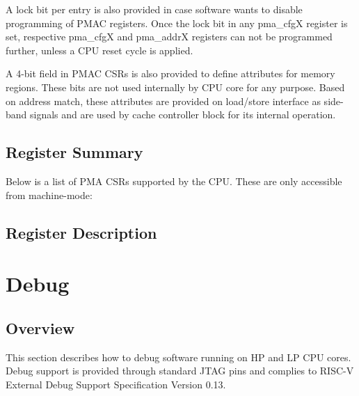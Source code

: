\documentclass[main\_\_EN.tex]{subfiles}
\begin{document}
A lock bit per entry is also provided in case software wants to disable programming of PMAC registers. Once the lock bit in any pma\_cfgX register is set, respective pma\_cfgX and pma\_addrX registers can not be programmed further, unless a CPU reset cycle is applied.

A 4-bit field in PMAC CSRs is also provided to define attributes for memory regions. These bits are not used internally by CPU core for any purpose. Based on address match, these attributes are provided on load/store interface as side-band signals and are used by cache controller block for its internal operation.


\clearpage
\hypertarget{riscvcpu-pma-reg-summ}{}
\subsection{Register Summary}
\label{sec:riscvcpu-pma-reg-summ}


Below is a list of PMA CSRs supported by the CPU. These are only accessible from machine-mode:




\subsection{Register Description}
\label{sec:riscvcpu-pma-reg-desc}




\clearpage
\section{Debug}
\label{sec:riscvcpu-dbg}



\subsection{Overview}
\label{sec:riscvcpu-dbg-overview}
This section describes how to debug software running on HP and LP CPU cores. Debug support is provided through standard JTAG pins and complies to RISC-V External Debug Support Specification Version 0.13.
\end{document}
